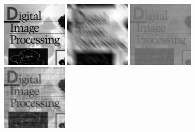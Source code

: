 \documentclass{article}
\begin{document}
\includegraphics[width=0.25\textwidth]{../data/book_cover.jpg}
\includegraphics[width=0.25\textwidth]{../data/blur_1_book_cover.jpg}
\includegraphics[width=0.25\textwidth]{../data/inverse_1_book_cover.jpg}
\includegraphics[width=0.25\textwidth]{../data/wiener_deconvolution_1_book_cover.jpg}
\end{document}
